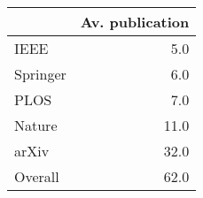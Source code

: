 \begin{tabular}{lr}
\toprule
{} &  Av. publication \\
\midrule
IEEE     &              5.0 \\
Springer &              6.0 \\
PLOS     &              7.0 \\
Nature   &             11.0 \\
arXiv    &             32.0 \\
Overall  &             62.0 \\
\bottomrule
\end{tabular}
